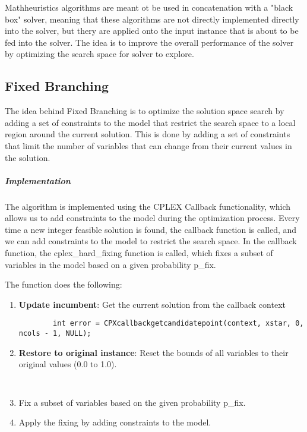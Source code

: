 \documentclass{article}
\begin{document}
Mathheuristics algorithms are meant ot be used in concatenation with a "black box" solver, meaning that these algorithms are not directly implemented directly into the solver, but thery are 
applied onto the input instance that is about to be fed into the solver. The idea is to improve the overall performance of the solver by optimizing the search space for solver to explore.\cite{Fischetti2016Matheuristics}

\subsection{Fixed Branching}
The idea behind Fixed Branching is to optimize the solution space search by adding a set of constraints to the model that restrict the search space to a local region around the current solution.
This is done by adding a set of constraints that limit the number of variables that can change from their current values in the solution. 

\subparagraph{Implementation}
The algorithm is implemented using the CPLEX Callback functionality, which allows us to add constraints to the model during the optimization process. Every time a new integer feasible solution is found, the callback function is called, 
and we can add constraints to the model to restrict the search space. 
In the callback function, the cplex\_hard\_fixing function is called, which fixes a subset of variables in the model based on a given probability p\_fix.

The function does the following:
\begin{enumerate}
	\item \textbf{Update incumbent}: Get the current solution from the callback context
	\begin{lstlisting}
		int error = CPXcallbackgetcandidatepoint(context, xstar, 0, ncols - 1, NULL);
	\end{lstlisting}
	\item \textbf{Restore to original instance}: Reset the bounds of all variables to their original values (0.0 to 1.0).
	\begin{lstlisting}
		
	\end{lstlisting}
	\item Fix a subset of variables based on the given probability p\_fix.
	\item Apply the fixing by adding constraints to the model.
\end{enumerate}
\end{document}
